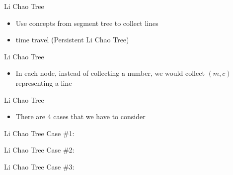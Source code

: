 \documentclass[aspectratio=169,xcolor=dvipsnames]{beamer}
\begin{document}
\begin{frame}[plain]{Li Chao Tree}
\begin{itemize}
    \item Use concepts from segment tree to collect lines
    \item time travel (Persistent Li Chao Tree)
\end{itemize}
\end{frame}

\begin{frame}[t, plain]{Li Chao Tree}
\begin{itemize}
    \item In each node, instead of collecting a number, we would collect $(m, c)$ representing a line
    
\end{itemize}
\end{frame}

\begin{frame}[t, plain]{Li Chao Tree}
\begin{itemize}
    \item There are 4 cases that we have to consider
\end{itemize}
\end{frame}

\begin{frame}[t, plain]{Li Chao Tree}
Case \#1:
\begin{center}
\end{center}
\end{frame}

\begin{frame}[t, plain]{Li Chao Tree}
Case \#2:

\begin{center}
\end{center}
\end{frame}

\begin{frame}[t, plain]{Li Chao Tree}
Case \#3:

\begin{center}
\end{center}
\end{frame}
\end{document}
